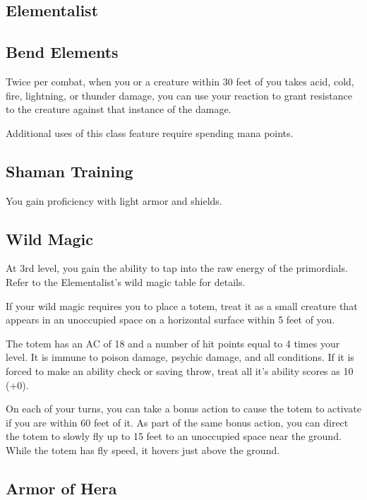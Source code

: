 
\begin{multicols*}{2}

\section{Elementalist}

\subsection*{Bend Elements}

Twice per combat, when you or a creature within 30 feet of you takes acid, cold, fire, lightning, or thunder damage, you can use your reaction to grant resistance to the creature against that instance of the damage.

Additional uses of this class feature require spending mana points.

\subsection*{Shaman Training}

You gain proficiency with light armor and shields.

\subsection*{Wild Magic}

At 3rd level, you gain the ability to tap into the raw energy of the primordials. Refer to the Elementalist's wild magic table for details.

If your wild magic requires you to place a totem, treat it as a small creature that appears in an unoccupied space on a horizontal surface within 5 feet of you.

The totem has an AC of 18 and a number of hit points equal to 4 times your level. It is immune to poison damage, psychic damage, and all conditions. If it is forced to make an ability check or saving throw, treat all it's ability scores as 10 (+0). 

On each of your turns, you can take a bonus action to cause the totem to activate if you are within 60 feet of it. As part of the same bonus action, you can direct the totem to slowly fly up to 15 feet to an unoccupied space near the ground. While the totem has fly speed, it hovers just above the ground.


\subsection*{Armor of Hera}


\end{multicols*}
